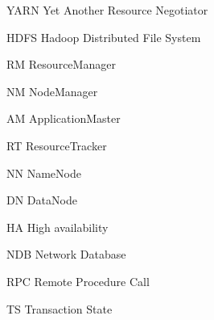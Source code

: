 \begin{basedescript}{\desclabelstyle{\pushlabel}\desclabelwidth{10em}}
\item[YARN] Yet Another Resource Negotiator
  \cite{Vavilapalli:2013:AHY:2523616.2523633}
\item[HDFS] Hadoop Distributed File System \cite{hdfs}
\item[RM] ResourceManager
\item[NM] NodeManager
\item[AM] ApplicationMaster
\item[RT] ResourceTracker
\item[NN] NameNode
\item[DN] DataNode
\item[HA] High availability
\item[NDB] Network Database
\item[RPC] Remote Procedure Call
\item[TS] Transaction State
\end{basedescript}